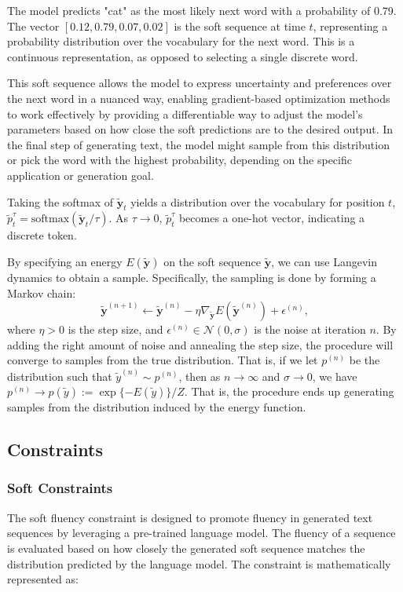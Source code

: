 \documentclass{article}
\begin{document}
The model predicts "cat" as the most likely next word with a probability of 0.79. The vector \([0.12, 0.79, 0.07, 0.02]\) is the soft sequence at time \(t\), representing a probability distribution over the vocabulary for the next word. This is a continuous representation, as opposed to selecting a single discrete word.

This soft sequence allows the model to express uncertainty and preferences over the next word in a nuanced way, enabling gradient-based optimization methods to work effectively by providing a differentiable way to adjust the model's parameters based on how close the soft predictions are to the desired output. In the final step of generating text, the model might sample from this distribution or pick the word with the highest probability, depending on the specific application or generation goal.

Taking the softmax of $\tilde{\boldsymbol{y}}_t$ yields a distribution over the vocabulary for position $t$, $\tilde{p}_t^\tau = \text{softmax}(\tilde{\boldsymbol{y}}_t/\tau)$. As $\tau \rightarrow 0$, $\tilde{p}_t^\tau$ becomes a one-hot vector, indicating a discrete token.

By specifying an energy $E(\tilde{\boldsymbol{y}})$ on the soft sequence $\tilde{\boldsymbol{y}}$, we can use Langevin dynamics to obtain a sample. Specifically, the sampling is done by forming a Markov chain:
\begin{equation}
    \tilde{\boldsymbol{y}}^{(n+1)} \leftarrow \tilde{\boldsymbol{y}}^{(n)} - \eta \nabla_{\tilde{\boldsymbol{y}}} E(\tilde{\boldsymbol{y}}^{(n)}) + \epsilon^{(n)},
    \label{eq:langevin}
\end{equation}
where $\eta > 0$ is the step size, and $\epsilon^{(n)} \in \mathcal{N}(0, \sigma)$ is the noise at iteration $n$. By adding the right amount of noise and annealing the step size, the procedure will converge to samples from the true distribution. That is, if we let $p^{(n)}$ be the distribution such that $\tilde{y}^{(n)} \sim p^{(n)}$, then as $n \rightarrow \infty$ and $\sigma \rightarrow 0$, we have $p^{(n)} \rightarrow p(\tilde{y}) := \exp\{-E(\tilde{y})\}/Z$. That is, the procedure ends up generating samples from the distribution induced by the energy function.

\subsection{Constraints}
\subsubsection{Soft Constraints}
The soft fluency constraint is designed to promote fluency in generated text sequences by leveraging a pre-trained language model. The fluency of a sequence is evaluated based on how closely the generated soft sequence matches the distribution predicted by the language model. The constraint is mathematically represented as:
\end{document}
